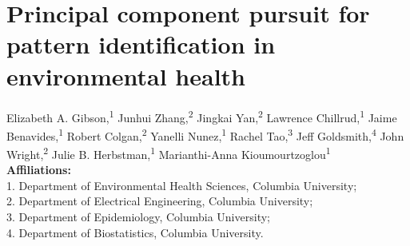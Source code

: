 \chapter[Principal component pursuit]{Principal component pursuit for pattern identification in environmental health}\label{sec:ch2}
\vspace{-3em}
\begin{center}
Elizabeth A. Gibson,\textsuperscript{1} 
Junhui Zhang,\textsuperscript{2} 
Jingkai Yan,\textsuperscript{2}
Lawrence Chillrud,\textsuperscript{1} 
Jaime Benavides,\textsuperscript{1} 
Robert Colgan,\textsuperscript{2} 
Yanelli Nunez,\textsuperscript{1} 
Rachel Tao,\textsuperscript{3} 
Jeff Goldsmith,\textsuperscript{4} 
John Wright,\textsuperscript{2} 
Julie B. Herbstman,\textsuperscript{1} 
Marianthi-Anna Kioumourtzoglou\textsuperscript{1} \\ 

\textbf{Affiliations:} \\ 
1. Department of Environmental Health Sciences, Columbia University; \\ 
2. Department of Electrical Engineering, Columbia University; \\ 
3. Department of Epidemiology, Columbia University; \\
4. Department of Biostatistics, Columbia University. \\ 
\end{center}

\clearpage

